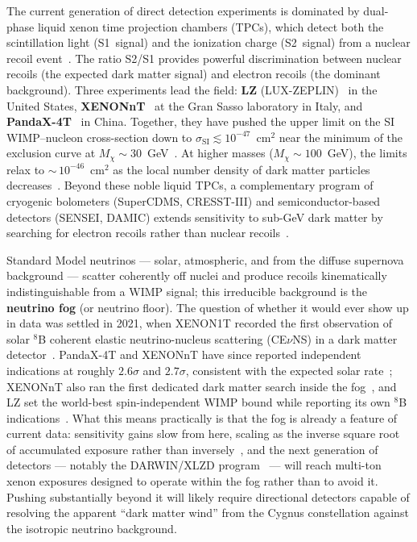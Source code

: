 The current generation of direct detection experiments is dominated by dual-phase liquid xenon time projection chambers (TPCs), which detect both the scintillation light (S1~signal) and the ionization charge (S2~signal) from a nuclear recoil event~\cite{Cirelli:2024ssz}.
The ratio S2/S1 provides powerful discrimination between nuclear recoils (the expected dark matter signal) and electron recoils (the dominant background).
Three experiments lead the field: \textbf{LZ} (LUX-ZEPLIN)~\cite{LZ:2022lsv} in the United States, \textbf{XENONnT}~\cite{XENON:2023cxc} at the Gran Sasso laboratory in Italy, and \textbf{PandaX-4T}~\cite{PandaX-4T:2021bab} in China.
Together, they have pushed the upper limit on the SI WIMP--nucleon cross-section down to $\sigma_\text{SI} \lesssim 10^{-47}$~cm$^2$ near the minimum of the exclusion curve at $M_\chi \sim 30$~GeV~\cite{LZ:2022lsv,XENON:2023cxc,PandaX-4T:2021bab}.
At higher masses ($M_\chi \sim 100$~GeV), the limits relax to ${\sim}\,10^{-46}$~cm$^2$ as the local number density of dark matter particles decreases~\cite{LZ:2024zvo}.
Beyond these noble liquid TPCs, a complementary program of cryogenic bolometers (SuperCDMS, CRESST-III) and semiconductor-based detectors (SENSEI, DAMIC) extends sensitivity to sub-GeV dark matter by searching for electron recoils rather than nuclear recoils~\cite{Cirelli:2024ssz}.

Standard Model neutrinos --- solar, atmospheric, and from the diffuse supernova background --- scatter coherently off nuclei and produce recoils kinematically indistinguishable from a WIMP signal; this irreducible background is the \textbf{neutrino fog} (or neutrino floor).
The question of whether it would ever show up in data was settled in 2021, when XENON1T recorded the first observation of solar $^8$B coherent elastic neutrino-nucleus scattering (CE$\nu$NS) in a dark matter detector~\cite{XENON:2020gfr}.
PandaX-4T and XENONnT have since reported independent indications at roughly $2.6\sigma$ and $2.7\sigma$, consistent with the expected solar rate~\cite{PandaX:2024muv,XENON:2024hup}; XENONnT also ran the first dedicated dark matter search inside the fog~\cite{XENON:2024hup}, and LZ set the world-best spin-independent WIMP bound while reporting its own $^8$B indications~\cite{LZ:2024zvo}.
What this means practically is that the fog is already a feature of current data: sensitivity gains slow from here, scaling as the inverse square root of accumulated exposure rather than inversely~\cite{OHare:2021utq}, and the next generation of detectors --- notably the DARWIN/XLZD program~\cite{DARWIN:2016hyl} --- will reach multi-ton xenon exposures designed to operate within the fog rather than to avoid it.
Pushing substantially beyond it will likely require directional detectors capable of resolving the apparent ``dark matter wind'' from the Cygnus constellation against the isotropic neutrino background.

